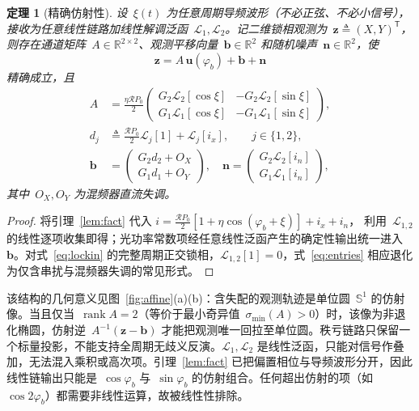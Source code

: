 \documentclass[journal]{IEEEtran}
\theoremstyle{plain}
\newtheorem{theorem}{定理}
\theoremstyle{remark}
\newcommand{\zv}{\mathbf{z}}
\newcommand{\uv}{\mathbf{u}}
\newcommand{\bv}{\mathbf{b}}
\newcommand{\nv}{\mathbf{n}}
\newcommand{\Lc}{\mathcal{L}}
\newcommand{\T}{\mathsf{T}}
\begin{document}
\begin{theorem}[精确仿射性]
\label{th:affine}
设~$\xi(t)$ 为任意周期导频波形（不必正弦、不必小信号），接收为任意线性链路加线性解调泛函~$\Lc_1,\Lc_2$。记二维锁相观测为~$\zv\triangleq(X,Y)^{\T}$，则存在通道矩阵~$A\in\mathbb{R}^{2\times2}$、观测平移向量~$\bv\in\mathbb{R}^2$ 和随机噪声~$\nv\in\mathbb{R}^2$，使
\begin{equation}
\boxed{\;\zv=A\,\uv(\varphi_b)+\bv+\nv\;}
\label{eq:affine}
\end{equation}
精确成立，且
\begin{align}
A&=\frac{\eta\mathcal{R} P_0}{2}
\begin{pmatrix}
G_2\Lc_2[\cos\xi] & -G_2\Lc_2[\sin\xi]\\
G_1\Lc_1[\cos\xi] & -G_1\Lc_1[\sin\xi]
\end{pmatrix},\nonumber\\
 d_j&\triangleq\frac{\mathcal{R} P_0}{2}\Lc_j[1]+\Lc_j[i_x],\qquad j\in\{1,2\},\nonumber\\
\bv&=\begin{pmatrix}G_2d_2+O_X\\G_1d_1+O_Y\end{pmatrix},\quad
\nv=\begin{pmatrix}G_2\Lc_2[i_n]\\ G_1\Lc_1[i_n]\end{pmatrix},
\label{eq:entries}
\end{align}
其中~$O_X,O_Y$ 为混频器直流失调。
\end{theorem}
\begin{proof}
将引理~\ref{lem:fact} 代入
$i=\tfrac{\mathcal{R} P_0}{2}[1+\eta\cos(\varphi_b+\xi)]+i_x+i_n$，
利用~$\Lc_{1,2}$ 的线性逐项收集即得；光功率常数项经任意线性泛函产生的确定性输出统一进入~$\bv$。对式~\eqref{eq:lockin} 的完整周期正交锁相，$\Lc_{1,2}[1]=0$，式~\eqref{eq:entries} 相应退化为仅含串扰与混频器失调的常见形式。
\end{proof}

该结构的几何意义见图~\ref{fig:affine}(a)(b)：含失配的观测轨迹是单位圆~$\mathbb{S}^1$ 的仿射像。当且仅当~$\operatorname{rank}A=2$（等价于最小奇异值~$\sigma_{\min}(A)>0$）时，该像为非退化椭圆，仿射逆~$A^{-1}(\zv-\bv)$ 才能把观测唯一回拉至单位圆。秩亏链路只保留一个标量投影，不能支持全周期无歧义反演。$\Lc_1,\Lc_2$ 是线性泛函，只能对信号作叠加，无法混入乘积或高次项。引理~\ref{lem:fact} 已把偏置相位与导频波形分开，因此线性链输出只能是~$\cos\varphi_b$ 与~$\sin\varphi_b$ 的仿射组合。任何超出仿射的项（如~$\cos 2\varphi_b$）都需要非线性运算，故被线性性排除。
\end{document}
